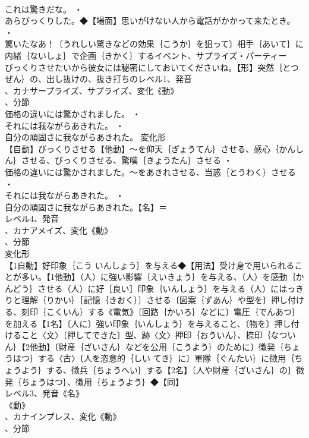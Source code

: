 \documentclass[8pt]{extreport}
\begin{document}
\begin{CJK}{UTF8}{min}
\\	これは驚きだな。 ・
\\	あらびっくりした。◆【場面】思いがけない人から電話がかかって来たとき。 ・
\\	驚いたなあ！〔うれしい驚きなどの効果｛こうか｝を狙って〕相手｛あいて｝に内緒｛ないしょ｝で企画｛きかく｝するイベント、サプライズ・パーティー
\\	びっくりさせたいから彼女には秘密にしておいてくださいね。【形】突然｛とつぜん｝の、出し抜けの、抜き打ちのレベル1、発音
\\	、カナサープライズ、サプライズ、変化《動》
\\	、分節
\\	価格の違いには驚かされました。 ・
\\	それには我ながらあきれた。 ・
\\	自分の頑固さに我ながらあきれた。	変化形 
\\	【自動】びっくりさせる【他動】～を仰天｛ぎょうてん｝させる、感心｛かんしん｝させる、びっくりさせる、驚嘆｛きょうたん｝させる ・
\\	価格の違いには驚かされました。～をあきれさせる、当惑｛とうわく｝させる ・
\\	それには我ながらあきれた。 ・
\\	自分の頑固さに我ながらあきれた。【名】＝ 
\\	レベル4、発音
\\	、カナアメイズ、変化《動》
\\	、分節
\\	変化形 
\\	【1自動】好印象｛こう いんしょう｝を与える◆【用法】受け身で用いられることが多い。【1他動】（人）に強い影響｛えいきょう｝を与える、（人）を感動｛かんどう｝させる（人）に好［良い］印象｛いんしょう｝を与える（人）にはっきりと理解｛りかい｝［記憶｛きおく｝］させる〔図案｛ずあん｝や型を〕押し付ける、刻印｛こくいん｝する《電気》〔回路｛かいろ｝などに〕電圧｛でんあつ｝を加える【1名】〔人に〕強い印象｛いんしょう｝を与えること、〔物を〕押し付けること〈文〉〔押してできた〕型、跡〈文〉押印｛おういん｝、捺印｛なついん｝【2他動】〔財産｛ざいさん｝などを公用｛こうよう｝のために〕徴発｛ちょうはつ｝する〈古〉〔人を恣意的｛しい てき｝に〕軍隊｛ぐんたい｝に徴用｛ちょうよう｝する、徴兵｛ちょうへい｝する【2名】〔人や財産｛ざいさん｝の〕徴発｛ちょうはつ｝、徴用｛ちょうよう｝◆【同】
\\	レベル3、発音《名》
\\	《動》
\\	、カナインプレス、変化《動》
\\	、分節

\end{CJK}
\end{document}
